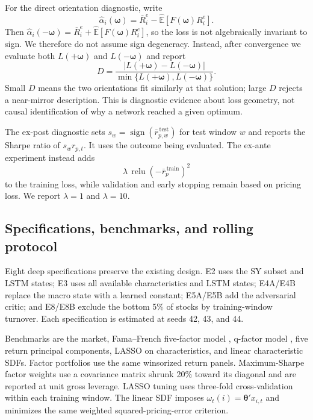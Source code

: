 \documentclass[12pt]{article}
\begin{document}
For the direct orientation diagnostic, write
\begin{equation}
\widehat\alpha_i(\bm\omega)=\overline R_i^e-
\widehat{\mathbb{E}}\!\left[F(\bm\omega)R_i^e\right].
\end{equation}
Then $\widehat\alpha_i(-\bm\omega)=\overline R_i^e+
\widehat{\mathbb{E}}[F(\bm\omega)R_i^e]$, so the loss is not algebraically invariant to sign. We therefore do not assume sign degeneracy. Instead, after convergence we evaluate both $L(+\bm\omega)$ and $L(-\bm\omega)$ and report
\begin{equation}
D=\frac{|L(+\bm\omega)-L(-\bm\omega)|}
{\min\{L(+\bm\omega),L(-\bm\omega)\}}.
\label{eq:lossgap}
\end{equation}
Small $D$ means the two orientations fit similarly at that solution; large $D$ rejects a near-mirror description. This is diagnostic evidence about loss geometry, not causal identification of why a network reached a given optimum.

The ex-post diagnostic sets $s_w=\operatorname{sign}(\bar r_{p,w}^{\,\mathrm{test}})$ for test window $w$ and reports the Sharpe ratio of $s_wr_{p,t}$. It uses the outcome being evaluated. The ex-ante experiment instead adds
\begin{equation}
\lambda\,\operatorname{relu}
\!\left(-\bar r_p^{\,\mathrm{train}}\right)^2
\label{eq:pin}
\end{equation}
to the training loss, while validation and early stopping remain based on pricing loss. We report $\lambda=1$ and $\lambda=10$.

\subsection{Specifications, benchmarks, and rolling protocol}

Eight deep specifications preserve the existing design. E2 uses the SY subset and LSTM states; E3 uses all available characteristics and LSTM states; E4A/E4B replace the macro state with a learned constant; E5A/E5B add the adversarial critic; and E8/E8B exclude the bottom 5\% of stocks by training-window turnover. Each specification is estimated at seeds 42, 43, and 44.

Benchmarks are the market, Fama--French five-factor model \citep{ff2015}, q-factor model \citep{hxz2015}, five return principal components, LASSO on characteristics, and linear characteristic SDFs. Factor portfolios use the same winsorized return panels. Maximum-Sharpe factor weights use a covariance matrix shrunk 20\% toward its diagonal and are reported at unit gross leverage. LASSO tuning uses three-fold cross-validation within each training window. The linear SDF imposes $\omega_t(i)=\bm\theta'x_{i,t}$ and minimizes the same weighted squared-pricing-error criterion.
\end{document}
